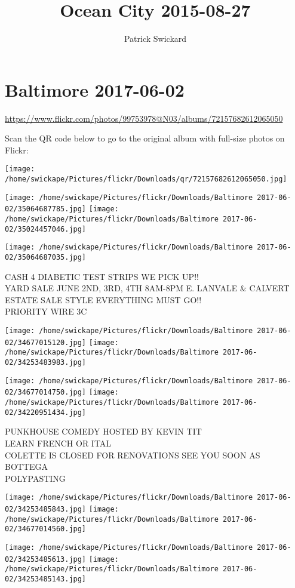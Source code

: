 \documentclass[10pt,letterpaper]{article}
\title{Ocean City 2015-08-27}
\author{Patrick Swickard}
\date{}
\begin{document}
\section*{Baltimore 2017-06-02}

\url{https://www.flickr.com/photos/99753978@N03/albums/72157682612065050}

Scan the QR code below to go to the original album with full-size photos on Flickr:

\texttt{[image: /home/swickape/Pictures/flickr/Downloads/qr/72157682612065050.jpg]}
\pagebreak

\texttt{[image: /home/swickape/Pictures/flickr/Downloads/Baltimore 2017-06-02/35064687785.jpg]}
\texttt{[image: /home/swickape/Pictures/flickr/Downloads/Baltimore 2017-06-02/35024457046.jpg]}

\vspace{0.25in}
\texttt{[image: /home/swickape/Pictures/flickr/Downloads/Baltimore 2017-06-02/35064687035.jpg]}

CASH 4 DIABETIC TEST STRIPS WE PICK UP!!\\
YARD SALE JUNE 2ND, 3RD, 4TH 8AM{-}8PM E. LANVALE \& CALVERT ESTATE SALE STYLE EVERYTHING MUST GO!!\\
PRIORITY WIRE 3C
\pagebreak

\texttt{[image: /home/swickape/Pictures/flickr/Downloads/Baltimore 2017-06-02/34677015120.jpg]}
\texttt{[image: /home/swickape/Pictures/flickr/Downloads/Baltimore 2017-06-02/34253483983.jpg]}

\texttt{[image: /home/swickape/Pictures/flickr/Downloads/Baltimore 2017-06-02/34677014750.jpg]}
\texttt{[image: /home/swickape/Pictures/flickr/Downloads/Baltimore 2017-06-02/34220951434.jpg]}

PUNKHOUSE COMEDY HOSTED BY KEVIN TIT\\
LEARN FRENCH OR ITAL\\
COLETTE IS CLOSED FOR RENOVATIONS SEE YOU SOON AS BOTTEGA\\
POLYPASTING
\pagebreak

\texttt{[image: /home/swickape/Pictures/flickr/Downloads/Baltimore 2017-06-02/34253485843.jpg]}
\texttt{[image: /home/swickape/Pictures/flickr/Downloads/Baltimore 2017-06-02/34677014560.jpg]}

\texttt{[image: /home/swickape/Pictures/flickr/Downloads/Baltimore 2017-06-02/34253485613.jpg]}
\texttt{[image: /home/swickape/Pictures/flickr/Downloads/Baltimore 2017-06-02/34253485143.jpg]}
\end{document}

